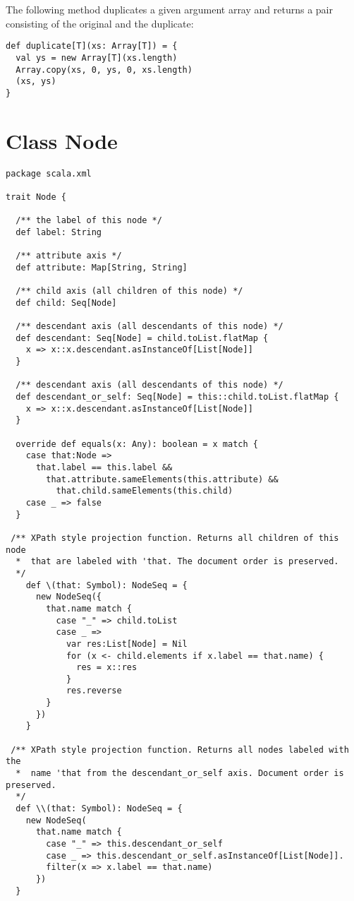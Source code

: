 {\example The following method duplicates a given argument array and returns a pair consisting of the original and the duplicate:
\begin{lstlisting}
def duplicate[T](xs: Array[T]) = {
  val ys = new Array[T](xs.length)
  Array.copy(xs, 0, ys, 0, xs.length)
  (xs, ys)
}
\end{lstlisting}

\section{Class Node}\label{cls:Node}
\begin{lstlisting}
package scala.xml 

trait Node {

  /** the label of this node */
  def label: String               

  /** attribute axis */
  def attribute: Map[String, String] 

  /** child axis (all children of this node) */
  def child: Seq[Node]          

  /** descendant axis (all descendants of this node) */
  def descendant: Seq[Node] = child.toList.flatMap { 
    x => x::x.descendant.asInstanceOf[List[Node]] 
  } 

  /** descendant axis (all descendants of this node) */
  def descendant_or_self: Seq[Node] = this::child.toList.flatMap { 
    x => x::x.descendant.asInstanceOf[List[Node]] 
  } 

  override def equals(x: Any): boolean = x match {
    case that:Node => 
      that.label == this.label && 
        that.attribute.sameElements(this.attribute) && 
          that.child.sameElements(this.child)
    case _ => false
  } 

 /** XPath style projection function. Returns all children of this node
  *  that are labeled with 'that. The document order is preserved.
  */
    def \(that: Symbol): NodeSeq = {
      new NodeSeq({
        that.name match {
          case "_" => child.toList  
          case _ =>
            var res:List[Node] = Nil 
            for (x <- child.elements if x.label == that.name) {
              res = x::res 
            }
            res.reverse
        }
      }) 
    }

 /** XPath style projection function. Returns all nodes labeled with the 
  *  name 'that from the descendant_or_self axis. Document order is preserved.
  */
  def \\(that: Symbol): NodeSeq = {
    new NodeSeq(
      that.name match {
        case "_" => this.descendant_or_self 
        case _ => this.descendant_or_self.asInstanceOf[List[Node]].
        filter(x => x.label == that.name) 
      })
  }


\end{lstlisting}}
